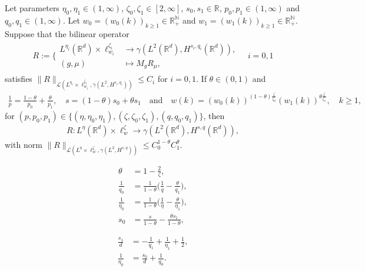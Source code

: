 \documentclass[10pt,a4paper]{amsart}
\def\R{{\mathbb R}}
\newcommand\bN{\mathbb{N}}
\newcommand\bR{\mathbb{R}}
\newcommand\cL{\mathcal{L}}
\begin{document}
\begin{proposition}
    \label{prop: interpolation}
    Let parameters $\eta_0,\eta_1\in (1,\infty)$,  $\zeta_0, \zeta_1\in [2, \infty]$, $s_0,s_1\in \bR$, $p_0,p_1\in (1,\infty)$ and $q_0,q_1\in (1,\infty)$.
    Let $w_0 = (w_0(k))_{k\geq 1}\in \bR_+^\bN$ and $w_1 = (w_1(k))_{k\geq 1}\in\bR_+^\bN$. 
Suppose  that the bilinear operator
    \begin{align}
        R:=\Bigg\{\begin{split}
        L^{\eta_i}(\R^d)\times \ell^{\zeta_i}_{w_i}&\rightarrow \gamma(L^2(\R^d),H^{s_i,q_i}(\R^d)),\\
        (g,\mu)&\mapsto M_gR_\mu,
        \end{split}
        \quad i = 0,1
    \end{align}
    satisfies $\|R\|_{\cL(L^{\eta_i}\times\ell^{\zeta_i}_{w_i},\gamma (L^2,H^{s_i,q_i}))}\leq C_i$ for $i = 0,1$.
    If $\theta\in (0,1)$ and
    \begin{align}
        \frac{1}{p} = \frac{1-\theta}{p_0}+\frac{\theta}{p_1},\quad s = (1-\theta)s_0 + \theta s_1 
        \quad\text{and}\quad
        w(k) = (w_0(k))^{(1-\theta)\frac{\zeta}{\zeta_0}}(w_1(k))^{\theta\frac{\zeta}{\zeta_1}},\quad k\geq 1,
    \end{align}
    for $(p,p_0,p_1)\in \{(\eta,\eta_0, \eta_1),(\zeta,\zeta_0, \zeta_1),(q,q_0, q_1)\}$, then
    \begin{align}
        R:
        L^{\eta}(\R^d)\times \ell^{\zeta}_w\rightarrow \gamma(L^2(\R^d),H^{s,q}(\R^d)),
    \end{align}
    with norm $\|R\|_{\cL(L^{\eta}\times\ell^{\zeta}_w,\gamma (L^2,H^{s,q}))}\leq C_0^{1-\theta}C_1^\theta$.
\end{proposition}

\begin{align}
\label{eq:condtheta}
\theta &= 1-\frac{2}{\zeta},
\\
    \label{eq:cond1} \frac{1}{q_0} &= \frac{1}{1-\theta} \Big(\frac{1}{q} - \frac{\theta}{q_1}\Big),
\\
\label{eq:cond2} \frac{1}{\eta_0} &= \frac{1}{1-\theta} \Big(\frac{1}{\eta} - \frac{\theta}{\eta_1}\Big),
\\
\label{eq:cond4} s_0 &= \frac{s}{1-\theta}-\frac{\theta s_1}{1-\theta},
\end{align}

\begin{align}
\label{eq:cond3} \frac{s_1}{d} &= - \frac{1}{q_1}  + \frac{1}{\eta_1}+\frac12,
\\
\label{eq:cond5} \frac{1}{\eta_0} &= \frac{s_0}{d} + \frac{1}{q_0}.
\end{align}
\end{document}
